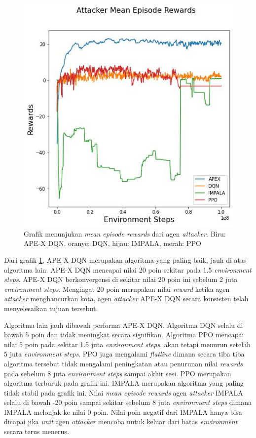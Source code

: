 \begin{figure}[H]
  \centering
    \includegraphics[scale=0.52]{gambar/attacker_reward_mean.jpg}
    \caption{Grafik menunjukan \emph{mean episode rewards} dari agen \emph{attacker}.
    Biru: APE-X DQN, oranye: DQN, hijau: IMPALA, merah: PPO}
    \label{fig:attackerMeanEpisodeGraph}
\end{figure}

Dari grafik \ref{fig:attackerMeanEpisodeGraph}, APE-X DQN merupakan algoritma yang paling baik,
jauh di atas algoritma lain. APE-X DQN mencapai nilai 20 poin sekitar pada 1.5 \emph{environment steps}.
APE-X DQN berkonvergensi di sekitar nilai 20 poin ini sebelum 2 juta \emph{environment steps}.
Mengingat 20 poin merupakan nilai \emph{reward} ketika agen \emph{attacker} menghancurkan kota,
agen \emph{attacker} APE-X DQN secara konsisten telah menyelesaikan tujuan tersebut.

Algoritma lain jauh dibawah performa APE-X DQN. Algoritma DQN selalu di bawah 5 poin dan tidak meningkat secara signifikan.
Algoritma PPO mencapai nilai 5 poin pada sekitar 1.5 juta \emph{environment steps}, akan tetapi menurun setelah 5 juta
\emph{environment steps}. PPO juga mengalami \emph{flatline} dimana secara tiba tiba algoritma tersebut
tidak mengalami peningkatan atau penurunan nilai \emph{rewards} pada sebelum 8 juta \emph{environment steps}
sampai akhir sesi. PPO merupakan algoritma terburuk pada grafik ini. IMPALA merupakan algoritma yang paling tidak stabil pada grafik ini.
Nilai \emph{mean episode rewards} agen \emph{attacker} IMPALA selalu di bawah -20 poin sampai
sekitar sebelum 8 juta \emph{environment steps} dimana IMPALA melonjak ke nilai 0 poin.
Nilai poin negatif dari IMPALA hanya bisa dicapai jika \emph{unit} agen \emph{attacker} mencoba untuk keluar
dari batas \emph{environment} secara terus menerus.

